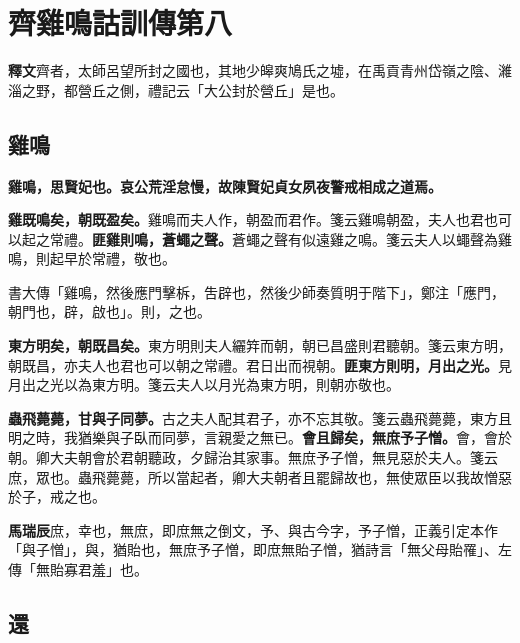 \chapter{齊雞鳴詁訓傳第八}

\begin{quoting}\textbf{釋文}齊者，太師呂望所封之國也，其地少皞爽鳩氏之墟，在禹貢青州岱嶺之陰、濰淄之野，都營丘之側，禮記云「大公封於營丘」是也。\end{quoting}

\section{雞鳴}


\textbf{雞鳴，思賢妃也。哀公荒淫怠慢，故陳賢妃貞女夙夜警戒相成之道焉。}

\textbf{雞既鳴矣，朝既盈矣。}{\footnotesize 雞鳴而夫人作，朝盈而君作。箋云雞鳴朝盈，夫人也君也可以起之常禮。}\textbf{匪雞則鳴，蒼蠅之聲。}{\footnotesize 蒼蠅之聲有似遠雞之鳴。箋云夫人以蠅聲為雞鳴，則起早於常禮，敬也。}

\begin{quoting}書大傳「雞鳴，然後應門擊柝，吿辟也，然後少師奏質明于階下」，鄭注「應門，朝門也，辟，啟也」。則，之也。\end{quoting}

\textbf{東方明矣，朝既昌矣。}{\footnotesize 東方明則夫人纚筓而朝，朝已昌盛則君聽朝。箋云東方明，朝既昌，亦夫人也君也可以朝之常禮。君日出而視朝。}\textbf{匪東方則明，月出之光。}{\footnotesize 見月出之光以為東方明。箋云夫人以月光為東方明，則朝亦敬也。}

\textbf{蟲飛薨薨，甘與子同夢。}{\footnotesize 古之夫人配其君子，亦不忘其敬。箋云蟲飛薨薨，東方且明之時，我猶樂與子臥而同夢，言親愛之無已。}\textbf{會且歸矣，無庶予子憎。}{\footnotesize 會，會於朝。卿大夫朝會於君朝聽政，夕歸治其家事。無庶予子憎，無見惡於夫人。箋云庶，眾也。蟲飛薨薨，所以當起者，卿大夫朝者且罷歸故也，無使眾臣以我故憎惡於子，戒之也。}

\begin{quoting}\textbf{馬瑞辰}庶，幸也，無庶，即庶無之倒文，予、與古今字，予子憎，正義引定本作「與子憎」，與，猶貽也，無庶予子憎，即庶無貽子憎，猶詩言「無父母貽罹」、左傳「無貽寡君羞」也。\end{quoting}

\section{還}

